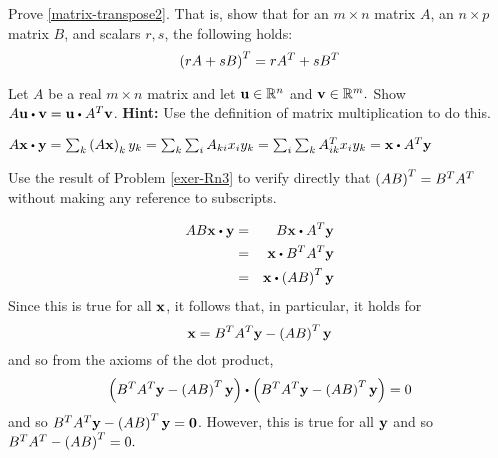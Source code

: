 \begin{enumialphparenastyle}
\begin{ex} Prove \ref{matrix-transpose2}. That is, show that for an $m \times n$ matrix $A$, an $n \times p$ matrix $B$, and scalars $r, s$, the following holds:
\[
\left(rA + sB \right) ^T = rA^{T} + sB^{T}
\]
\end{ex}

\begin{ex} \label{exer-Rn3}  Let $A$ be a real $m\times n$ matrix and
let $\mbox{\bf u}\in \mathbb{R}^{n}$ and $\mbox{\bf v}\in \mathbb{R}^{m}.$ Show 
$A\vect{u}\dotprod \vect{v}=\vect{u}\dotprod A^{T}\vect{v}$. 
\textbf{Hint:} Use the definition of matrix
multiplication to do this.
\begin{sol}
$A\vect{x}\dotprod \vect{y}=\sum_{k}\tup{A\vect{x}
} _{k}y_{k}=\sum_{k}\sum_{i}A_{ki}x_{i}y_{k}=\sum_{i}
\sum_{k}A_{ik}^{T}x_{i}y_{k}= \vect{x} \dotprod A^{T}\vect{y} $
\end{sol}
\end{ex}

\begin{ex} Use the result of Problem \ref{exer-Rn3} to verify directly
that $\left(AB\right) ^{T}=B^{T}A^{T}$ without making any reference to
subscripts.
\begin{sol}
\begin{eqnarray*}
 AB\vect{x} \dotprod \vect{y} &=& B\vect{x} \dotprod A^{T}\vect{y} \\ 
&=& \vect{x}\dotprod B^{T}A^{T}\vect{y} \\
&=& \vect{x}\dotprod \tup{AB} ^{T} \vect{y}
\end{eqnarray*}
Since this is true for all $\mbox{\bf x}$, it follows that, in particular, it
holds for
\[
\mbox{\bf x}=B^{T}A^{T}\mbox{\bf y}-\left(AB\right) ^{T}\mbox{\bf y}
\]
and so from the axioms of the dot product,
\[
\tup{B^{T}A^{T}\vect{y}-\tup{AB} ^{T}\vect{y}} \dotprod \tup{B^{T}A^{T}
\vect{y}-\tup{AB} ^{T}\vect{y}} =0
\]
and so $B^{T}A^{T}\mbox{\bf y}-\left(AB\right) ^{T}\mbox{\bf y}=\mbox{\bf 0}$. However,
this is true for all $\mbox{\bf y}$ and so $B^{T}A^{T}-\left(
AB\right) ^{T}=0.$
\end{sol}
\end{ex}
 
\end{enumialphparenastyle}
